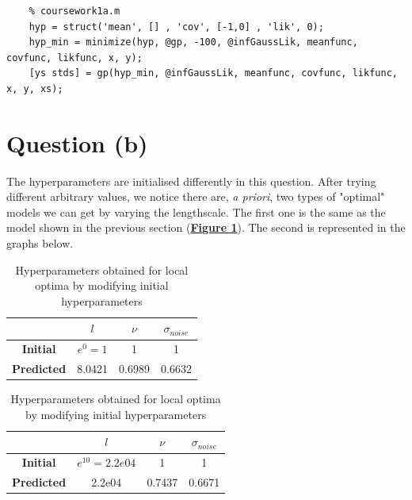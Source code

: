 \documentclass[a4paper,11pt]{article}
\begin{document}
\begin{lstlisting}
	% coursework1a.m
	hyp = struct('mean', [] , 'cov', [-1,0] , 'lik', 0);
	hyp_min = minimize(hyp, @gp, -100, @infGaussLik, meanfunc, covfunc, likfunc, x, y);
	[ys stds] = gp(hyp_min, @infGaussLik, meanfunc, covfunc, likfunc, x, y, xs);
\end{lstlisting}
\section*{Question (b)}
The hyperparameters are initialised differently in this question. After trying different arbitrary values, we notice there are, \textit{a priori}, two types of "optimal" models we can get by varying the lengthscale. The first one is the same as the model shown in the previous section (\hyperref[fig:1]{\textbf{Figure 1}}). The second is represented in the graphs below.
	\begin{table}[H]
	\centering
	\begin{tabular}{| c  | c | c | c |}
		\hline
		& \textbf{$l$} & $\nu$ & \textbf{$\sigma_{noise}$} \\
		\hline \hline
		\textbf{Initial} & $e^0=1$ & 1 & 1 \\
		\hline
		\textbf{Predicted} & 8.0421 & 0.6989 & 0.6632 \\
		\hline
	\end{tabular}
	\vspace{5pt}
	\begin{tabular}{| c  | c | c | c |}
		\hline
		& \textbf{$l$} & $\nu$ & \textbf{$\sigma_{noise}$} \\
		\hline \hline
		\textbf{Initial} & $e^{10}=2.2e04$ & 1 & 1 \\
		\hline
		\textbf{Predicted} & 2.2e04 & 0.7437 & 0.6671 \\
		\hline
	\end{tabular}
	
	\caption{Hyperparameters obtained for local optima by modifying initial hyperparameters}
\end{table}
\end{document}
